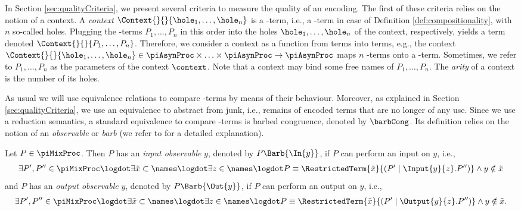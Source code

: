\documentclass[]{llncs}
\begin{document}
In Section \ref{sec:qualityCriteria}, we present several criteria to measure the quality of an encoding. The first of these criteria relies on the notion of a context. A \emph{context} $ \Context{}{}{\hole_1, \ldots, \hole_n} $ is a \piCal-term, i.e., a \piAsyn-term in case of Definition \ref{def:compositionality}, with~$ n $ so-called holes. Plugging the \piAsyn-terms $ P_1, \ldots, P_n $ in this order into the holes $ \hole_1, \ldots, \hole_n $ of the context, respectively, yields a term denoted $ \Context{}{}{P_1, \ldots, P_n} $. Therefore, we consider a context as a function from terms into terms, e.g., the context $ \Context{}{}{\hole_1, \ldots, \hole_n} \in \piAsynProc \times \ldots \times \piAsynProc \to \piAsynProc $ maps $ n $ \piAsyn-terms onto a \piAsyn-term. Sometimes, we refer to $ P_1, \ldots, P_n $ as the parameters of the context $ \context $. Note that a context may bind some free names of $ P_1, \ldots, P_n $. The \emph{arity} of a context is the number of its holes.

As usual we will use equivalence relations to compare \piCal-terms by means of their behaviour. Moreover, as explained in Section \ref{sec:qualityCriteria}, we use an equivalence to abstract from junk, i.e., remains of encoded terms that are no longer of any use. Since we use a reduction semantics, a standard equivalence to compare \piMix-terms is barbed congruence, denoted by $ \barbCong $. Its definition relies on the notion of an \emph{observable} or \emph{barb} (we refer to \cite{sangiorgiWalker01} for a detailed explanation).

\begin{definition}[Observable] \label{def:barb}
	Let $ P \in \piMixProc $. Then $ P $ has an \emph{input observable} $ y $, denoted by $ P\Barb{\In{y}} $, if $ P $ can perform an input on $ y $, i.e.,
	\begin{align*}
		\exists P', P'' \in \piMixProc \logdot \exists \tilde{x} \subset \names \logdot \exists z \in \names \logdot P \equiv \RestrictedTerm{\tilde{x}}{\left( P' \mid \Input{y}{z}.P'' \right)} \wedge y \notin \tilde{x}
	\end{align*}
	and $ P $ has an \emph{output observable} $ y $, denoted by $ P\Barb{\Out{y}} $, if $ P $ can perform an output on $ y $, i.e.,
	\begin{align*}
		\exists P', P'' \in \piMixProc \logdot \exists \tilde{x} \subset \names \logdot \exists z \in \names \logdot P \equiv \RestrictedTerm{\tilde{x}}{\left( P' \mid \Output{y}{z}.P'' \right)} \wedge y \notin \tilde{x}.
	\end{align*}
\end{definition}
\end{document}
